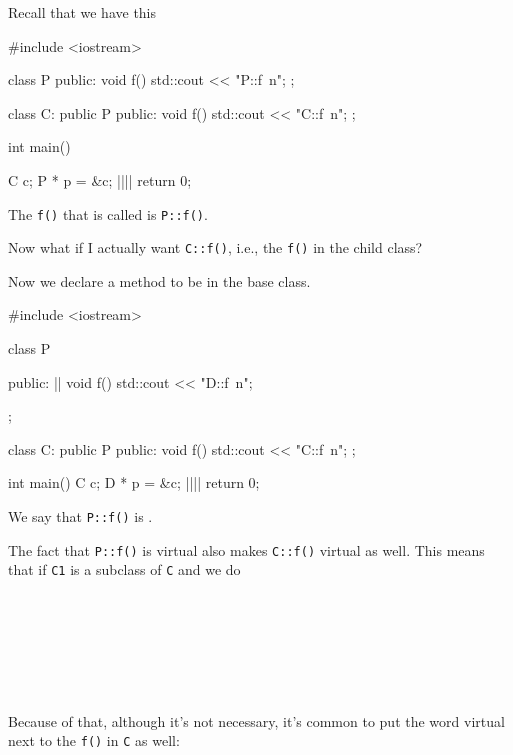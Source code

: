 Recall that we have this

\begin{consolethree}[escapeinside=||]
#include <iostream>

class P
{
public:
     void f()
     {    
          std::cout << "P::f\ n";
     }
};

class C: public P
{
public:
     void f()
     {    
          std::cout << "C::f\ n";
     }
};

int main()
{   
    C c;
    P * p = &c;
    ||||
    return 0;

}
\end{consolethree}

The \verb!f()! that is called is \verb!P::f()!.

Now what if I actually want \verb!C::f()!, i.e., the \verb!f()! in the child class?

Now we declare a method to be  in the base class.

\begin{consolethree}[escapeinside=||]
#include <iostream>

class P{
public:
     || void f() { std::cout << "D::f\ n"; }

};

class C: public P
{
public:
     void f() { std::cout << "C::f\ n"; }
};

int main()
{   
    C c;
    D * p = &c;
    ||||
    return 0;
}
\end{consolethree}

We say that \verb!P::f()! is .

The fact that \verb!P::f()! is virtual also makes \verb!C::f()! virtual as well. This means that if \verb!C1! is a subclass of \verb!C! and we do

\\
\\
\\
\\
\\
\\

Because of that, although it's not necessary, it's common to put the word virtual next to the \verb!f()! in \verb!C! as well:

